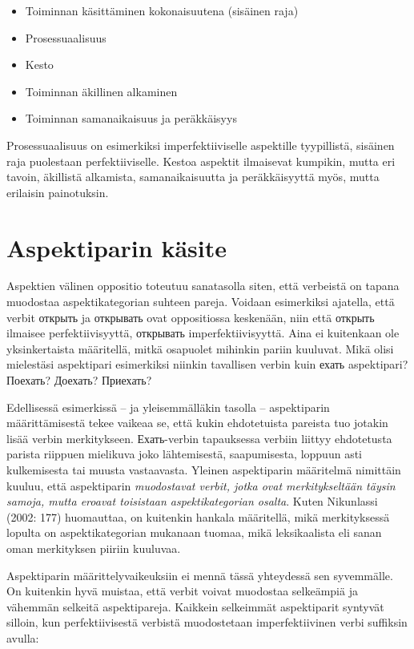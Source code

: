 \documentclass[]{scrreprt}
\providecommand{\tightlist}{%
  \setlength{\itemsep}{0pt}\setlength{\parskip}{0pt}}
\begin{document}
\begin{itemize}
\tightlist
\item
  Toiminnan käsittäminen kokonaisuutena (sisäinen raja)
\item
  Prosessuaalisuus
\item
  Kesto
\item
  Toiminnan äkillinen alkaminen
\item
  Toiminnan samanaikaisuus ja peräkkäisyys
\end{itemize}

Prosessuaalisuus on esimerkiksi imperfektiiviselle aspektille
tyypillistä, sisäinen raja puolestaan perfektiiviselle. Kestoa aspektit
ilmaisevat kumpikin, mutta eri tavoin, äkillistä alkamista,
samanaikaisuutta ja peräkkäisyyttä myös, mutta erilaisin painotuksin.

\section{Aspektiparin käsite}\label{aspektiparin-kuxe4site}

Aspektien välinen oppositio toteutuu sanatasolla siten, että verbeistä
on tapana muodostaa aspektikategorian suhteen pareja. Voidaan
esimerkiksi ajatella, että verbit открыть ja открывать ovat oppositiossa
keskenään, niin että открыть ilmaisee perfektiivisyyttä, открывать
imperfektiivisyyttä. Aina ei kuitenkaan ole yksinkertaista määritellä,
mitkä osapuolet mihinkin pariin kuuluvat. Mikä olisi mielestäsi
aspektipari esimerkiksi niinkin tavallisen verbin kuin ехать
aspektipari? Поехать? Доехать? Приехать?

Edellisessä esimerkissä -- ja yleisemmälläkin tasolla -- aspektiparin
määrittämisestä tekee vaikeaa se, että kukin ehdotetuista pareista tuo
jotakin lisää verbin merkitykseen. Ехать-verbin tapauksessa verbiin
liittyy ehdotetusta parista riippuen mielikuva joko lähtemisestä,
saapumisesta, loppuun asti kulkemisesta tai muusta vastaavasta. Yleinen
aspektiparin määritelmä nimittäin kuuluu, että aspektiparin
\emph{muodostavat verbit, jotka ovat merkitykseltään täysin samoja,
mutta eroavat toisistaan aspektikategorian osalta}. Kuten Nikunlassi
(2002: 177) huomauttaa, on kuitenkin hankala määritellä, mikä
merkityksessä lopulta on aspektikategorian mukanaan tuomaa, mikä
leksikaalista eli sanan oman merkityksen piiriin kuuluvaa.

Aspektiparin määrittelyvaikeuksiin ei mennä tässä yhteydessä sen
syvemmälle. On kuitenkin hyvä muistaa, että verbit voivat muodostaa
selkeämpiä ja vähemmän selkeitä aspektipareja. Kaikkein selkeimmät
aspektiparit syntyvät silloin, kun perfektiivisestä verbistä
muodostetaan imperfektiivinen verbi suffiksin avulla:
\end{document}
